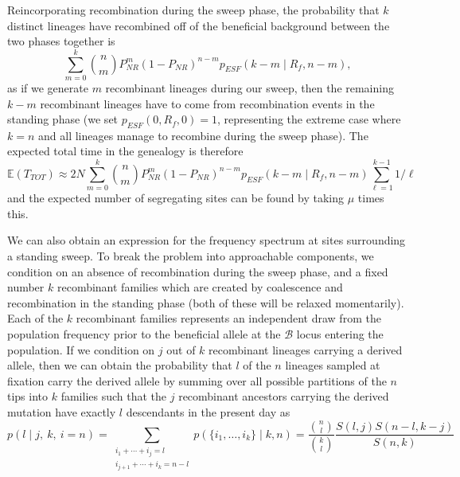 \documentclass[a4paper,10pt]{article}
\newcommand{\fancyB}{$\mathcal B$ }
\begin{document}
Reincorporating recombination during the sweep phase, the probability that $k$ distinct lineages have recombined off of the beneficial background between the two phases together is
\begin{equation}
	\sum_{m=0}^{k} {n \choose m} P_{NR}^{m} (1-P_{NR})^{n-m} p_{ESF}\left(k-m\mid R_f, n-m\right),
\end{equation}
as if we generate $m$ recombinant lineages during our sweep, then the remaining $k-m$ recombinant lineages have to come from recombination events in the standing phase (we set $p_{ESF}\left(0,R_f,0\right)=1$, representing the extreme case where $k=n$ and all lineages manage to recombine during the sweep phase). The expected total time in the genealogy is therefore
\begin{equation}
\mathbb{E}(T_{TOT})  \approx 2N\sum_{m=0}^{k} {n \choose m} P_{NR}^{m} (1-P_{NR})^{n-m} p_{ESF}\left(k-m\mid R_f, n-m\right)   \sum_{\ell=1}^{k-1} 1/\ell
\end{equation}
and the expected number of segregating sites can be found by taking $\mu$ times this. 

We can also obtain an expression for the frequency spectrum at sites surrounding a standing sweep. To break the problem into approachable components, we condition on an absence of recombination during the sweep phase, and a fixed number $k$ recombinant families which are created by coalescence and recombination in the standing phase (both of these will be relaxed momentarily). Each of the $k$ recombinant families represents an independent draw from the population frequency prior to the beneficial allele at the \fancyB locus entering the population. If we condition on $j$ out of $k$ recombinant lineages carrying a derived allele, then we can obtain the probability that $l$ of the $n$ lineages sampled at fixation carry the derived allele by summing over all possible partitions of the $n$ tips into $k$ families such that the $j$ recombinant ancestors carrying the derived mutation have exactly $l$ descendants in the present day as
\begin{equation}
p(l \mid j, ~k,~i=n) = \sum_{\substack{i_1+\cdots +i_j=l \\i_{j+1}+\cdots + i_k=n-l}} p(\{i_1,\dots,i_k\} \mid k, n) = \frac{ {n \choose l} }{ {k \choose l} }\frac{ S(l,j)  S(n-l,k-j)  }{ S(n,k) } \label{ESF_gives_freq_spec}
\end{equation}
\end{document}
